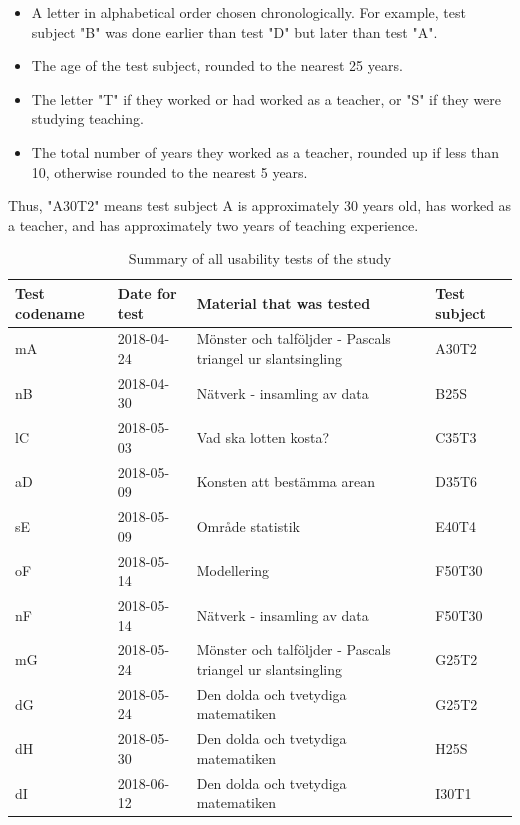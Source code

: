 \begin{itemize}
  \item A letter in alphabetical order chosen chronologically. For example, test subject "B" was done earlier than test "D" but later than test "A".
  \item The age of the test subject, rounded to the nearest 25 years.
  \item The letter "T" if they worked or had worked as a teacher, or "S" if they were studying teaching.
  \item The total number of years they worked as a teacher, rounded up if less than 10, otherwise rounded to the nearest 5 years.
\end{itemize}

Thus, "A30T2" means test subject A is approximately 30 years old, has worked as a teacher, and has approximately two years of teaching experience.

\bgroup
\def\arraystretch{1.5}
\begin{table}[H]
\centering
\caption{Summary of all usability tests of the study}
  \begin{tabular}{p{3cm}p{2.5cm}p{5cm}p{2.5cm}} \hline\hline
  Test codename & Date for test & Material that was tested & Test subject \\ \hline
  mA & 2018-04-24 & Mönster och talföljder - Pascals triangel ur slantsingling & A30T2 \\ \hline
  nB & 2018-04-30 & Nätverk - insamling av data & B25S \\ \hline
  lC & 2018-05-03 & Vad ska lotten kosta? & C35T3 \\ \hline
  aD & 2018-05-09 & Konsten att bestämma arean & D35T6 \\ \hline
  sE & 2018-05-09 & Område statistik & E40T4 \\ \hline
  oF & 2018-05-14 & Modellering & F50T30 \\ \hline
  nF & 2018-05-14 & Nätverk - insamling av data & F50T30 \\ \hline
  mG & 2018-05-24 & Mönster och talföljder - Pascals triangel ur slantsingling & G25T2 \\ \hline
  dG & 2018-05-24 & Den dolda och tvetydiga matematiken & G25T2 \\ \hline
  dH & 2018-05-30 & Den dolda och tvetydiga matematiken & H25S \\ \hline
  dI & 2018-06-12 & Den dolda och tvetydiga matematiken & I30T1
  \\ \hline\hline
\end{tabular}
\label{table:testsummary}
\end{table}
\egroup

